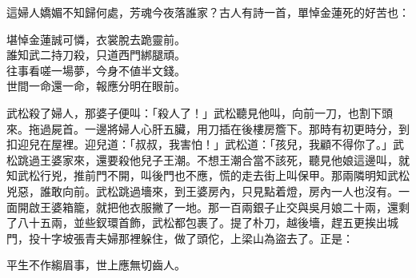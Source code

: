這婦人嬌媚不知歸何處，芳魂今夜落誰家？古人有詩一首，單悼金蓮死的好苦也：

\begin{myquote}
堪悼金蓮誠可憐，衣裳脫去跪靈前。\\誰知武二持刀殺，只道西門綁腿頑。\\往事看嗟一場夢，今身不値半文錢。\\世間一命還一命，報應分明在眼前。
\end{myquote}

武松殺了婦人，那婆子便叫：「殺人了！」武松聽見他叫，向前一刀，也割下頭來。拖過屍首。一邊將婦人心肝五臟，用刀插在後樓房簷下。那時有初更時分，到扣迎兒在屋裡。迎兒道：「叔叔，我害怕！」武松道：「孩兒，我顧不得你了。」武松跳過王婆家來，還要殺他兒子王潮。不想王潮合當不該死，聽見他娘這邊叫，就知武松行兇，推前門不開，叫後門也不應，慌的走去街上叫保甲。那兩隣明知武松兇惡，誰敢向前。武松跳過墻來，到王婆房內，只見點着燈，房內一人也沒有。一面開啟王婆箱籠，就把他衣服撇了一地。那一百兩銀子止交與吳月娘二十兩，還剩了八十五兩，並些釵環首飾，武松都包裹了。提了朴刀，越後墻，趕五更挨出城門，投十字坡張青夫婦那裡躲住，做了頭佗，上梁山為盜去了。正是：

\begin{myquote}
平生不作縐眉事，世上應無切齒人。
\end{myquote}

